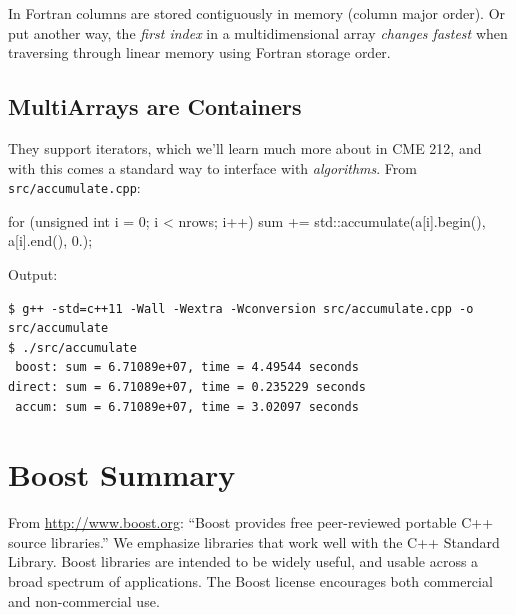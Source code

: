 \documentclass[12pt,letterpaper,twoside]{article}
\begin{document}
In Fortran columns are stored contiguously in memory (column major
order). Or put another way, the \emph{first index} in a multidimensional array
\emph{changes fastest} when traversing through linear memory using Fortran storage order.

\subsection{MultiArrays are Containers} They support iterators, which we'll learn much
more about in CME 212, and with this comes a standard way to interface with \emph{algorithms}.
From \texttt{src/accumulate.cpp}:

\begin{cpp}
  for (unsigned int i = 0; i < nrows; i++)
    sum += std::accumulate(a[i].begin(), a[i].end(), 0.);
\end{cpp}

Output:

{\small
\begin{verbatim}
$ g++ -std=c++11 -Wall -Wextra -Wconversion src/accumulate.cpp -o src/accumulate
$ ./src/accumulate
 boost: sum = 6.71089e+07, time = 4.49544 seconds
direct: sum = 6.71089e+07, time = 0.235229 seconds
 accum: sum = 6.71089e+07, time = 3.02097 seconds
\end{verbatim}
}
\section{Boost Summary}
From \url{http://www.boost.org}:
``Boost provides free peer-reviewed portable C++ source libraries.''
We emphasize libraries that work well with the C++ Standard Library.
Boost libraries are intended to be widely useful, and usable across a
broad spectrum of applications. The Boost license encourages both
commercial and non-commercial use.
\end{document}
